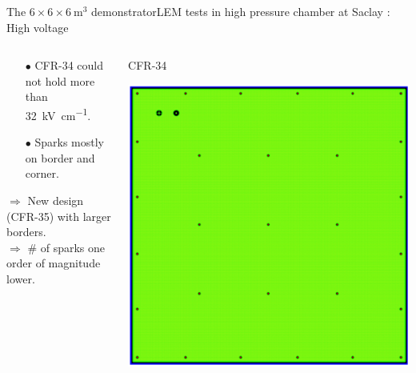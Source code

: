 \documentclass[10pt]{beamer}
\begin{document}
\begin{frame}{The \texorpdfstring{$6 \times 6 \times \SI{6}{\meter\cubed}$}{666} demonstrator}{LEM tests in high pressure chamber at Saclay : High voltage}
\begin{columns}
\begin{column}{0.5\textwidth}
\begin{center}
	    		\end{center}
    		\end{column}
    	\end{columns}\vfill
    	\begin{columns}
    		\begin{column}{0.5\textwidth}
    			\begin{scriptsize}
	    			\begin{itemize}
	    				\item[$\bullet$] CFR-34 could not hold more than \SI{32}{\kilo\volt\per\centi\meter}.
	    				\item[$\bullet$] Sparks mostly on border and corner.
	    			\end{itemize}
	    			$\Rightarrow$ New design (CFR-35) with larger borders.\\
	    			$\Rightarrow$ \# of sparks one order of magnitude lower.
	    		\end{scriptsize}
    		\end{column}\hfill
    		\begin{column}{0.5\textwidth}
    			\begin{minipage}{0.48\textwidth}
    				\centering
    				\begin{scriptsize}
	    				CFR-34
	    			\end{scriptsize}
    				\includegraphics[width=.9\textwidth]{figures/666/CFR-34.png}
    			\end{minipage}\hfill

\end{column}
\end{columns}
\end{frame}
\end{document}
